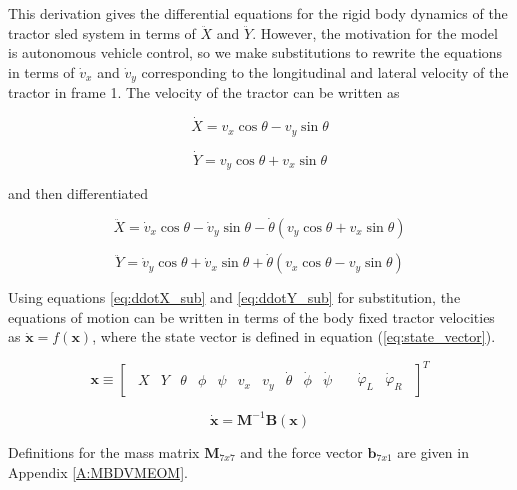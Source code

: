 This derivation gives the differential equations for the rigid body dynamics of the tractor sled system in terms of $\ddot X$ and $\ddot Y$. However, the motivation for the model is autonomous vehicle control, so we make substitutions to rewrite the equations in terms of $\dot v_x$ and $\dot v_y$ corresponding to the longitudinal and lateral velocity of the tractor in frame 1. The velocity of the tractor can be written as
\begin{linenomath*}
    \begin{equation}
          \dot X = v_x\cos\theta - v_y\sin\theta
    \end{equation}
\end{linenomath*}
\begin{linenomath*}
    \begin{equation}
          \dot Y = v_y\cos\theta + v_x\sin\theta
    \end{equation}
\end{linenomath*}
and then differentiated
\begin{linenomath*}
    \begin{equation}\label{eq:ddotX_sub}
          \ddot X = \dot v_x\cos\theta - \dot v_y\sin\theta - \dot\theta(v_y\cos\theta + v_x\sin\theta)
    \end{equation}
\end{linenomath*}
\begin{linenomath*}
    \begin{equation}\label{eq:ddotY_sub}
          \ddot Y = \dot v_y\cos\theta + \dot v_x\sin\theta + \dot\theta(v_x\cos\theta - v_y\sin\theta)
    \end{equation}
\end{linenomath*}
Using equations \ref{eq:ddotX_sub} and \ref{eq:ddotY_sub} for substitution, the equations of motion can be written in terms of the body fixed tractor velocities as $\mathbf{\dot x} = f(\mathbf{x})$, where the state vector is defined in equation (\ref{eq:state_vector}).
\begin{linenomath*}
    \begin{equation}\label{eq:state_vector}
        \mathbf{x} \equiv \begin{bmatrix}\begin{matrix} X & Y & \theta & \phi & \psi & v_x & v_y  & \dot\theta & \dot\phi & \dot\psi\end{matrix}\quad\begin{matrix} \dot\varphi_L & \dot\varphi_R \end{matrix}\end{bmatrix}^T
    \end{equation}
\end{linenomath*}
\begin{linenomath*}
    \begin{equation}
          \mathbf{\dot x} = \mathbf{M}^{-1}\mathbf{B}(\mathbf{x})
    \end{equation}
\end{linenomath*}
Definitions for the mass matrix $\mathbf{M}_{7x7}$ and the force vector $\mathbf{b}_{7x1}$ are given in Appendix \ref{A:MBDVMEOM}.

